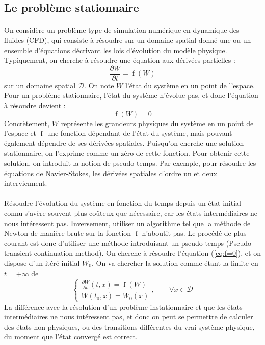 	\subsection{Le problème stationnaire}

		\paragraph{}
		On considère un problème type de simulation numérique en dynamique des fluides (CFD), qui consiste à résoudre sur un domaine spatial donné une ou un ensemble d'équations décrivant les lois d'évolution du modèle physique.
		Typiquement, on cherche à résoudre une équation aux dérivées partielles :
		$$\frac{\partial W}{\partial t} = \operatorname{f}\left(W\right)$$
		sur un domaine spatial $\mathcal{D}$.
		On note $W$ l'état du système en un point de l'espace.
		Pour un problème stationnaire, l'état du système n'évolue pas, et donc l'équation à résoudre devient :
		\begin{equation}\label{eq:f=0}
			\operatorname{f}\left(W\right) = 0
		\end{equation}
		Concrètement, $W$ représente les grandeurs physiques du système en un point de l'espace et $\operatorname{f}$ une fonction dépendant de l'état du système, mais pouvant également dépendre de ses dérivées spatiales.
		Puisqu'on cherche une solution stationnaire, on l'exprime comme un zéro de cette fonction.
		Pour obtenir cette solution, on introduit la notion de pseudo-temps\cite{KelleyKeyes1996}.
		Par exemple, pour résoudre les équations de Navier-Stokes, les dérivées spatiales d'ordre un et deux interviennent.

		\paragraph{}
		Résoudre l'évolution du système en fonction du temps depuis un état initial connu s'avère souvent plus coûteux que nécessaire, car les états intermédiaires ne nous intéressent pas.
		Inversement, utiliser un algorithme tel que la méthode de Newton de manière brute sur la fonction $\operatorname{f}$ n'aboutit pas.
		Le procédé de plus courant est donc  d'utiliser une méthode introduisant un pseudo-temps (Pseudo-transient continuation method).
		On cherche à résoudre l'équation (\ref{eq:f=0}), et on dispose d'un itéré initial $W_0$.
		On va chercher la solution comme étant la limite en $t = +\infty$ de
		\begin{equation}\label{eq:edp}
			\left\{\begin{aligned}
				\frac{\partial W}{\partial t}\left(t, x\right) = \operatorname{f}\left(W\right) \\
				W\left(t_0, x\right) = W_0\left(x\right)
			\end{aligned}\right.,\qquad \forall x\in\mathcal{D}
		\end{equation}
		La différence avec la résolution d'un problème instationnaire et que les états intermédiaires ne nous intéressent pas, et donc on peut se permettre de calculer des états non physiques, ou des transitions différentes du vrai système physique, du moment que l'état convergé est correct.


